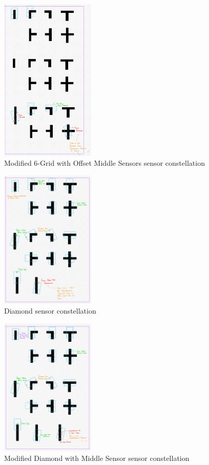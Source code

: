 \documentclass[conference]{IEEEtran}
\begin{document}
\begin{figure}[htbp]
	\centerline{\includegraphics[width=0.4\textwidth]{constellation-6-offset.png}}
	\caption{Modified 6-Grid with Offset Middle Sensors sensor constellation}
	\label{fig:constellation-6-offset}
\end{figure}
\begin{figure}[htbp]
	\centerline{\includegraphics[width=0.4\textwidth]{constellation-diamond.png}}
	\caption{Diamond sensor constellation}
	\label{fig:constellation-diamond}
\end{figure}
\begin{figure}[htbp]
	\centerline{\includegraphics[width=0.4\textwidth]{constellation-diamond-middle.png}}
	\caption{Modified Diamond with Middle Sensor sensor constellation}
	\label{fig:constellation-diamond-middle}
\end{figure}
\end{document}

